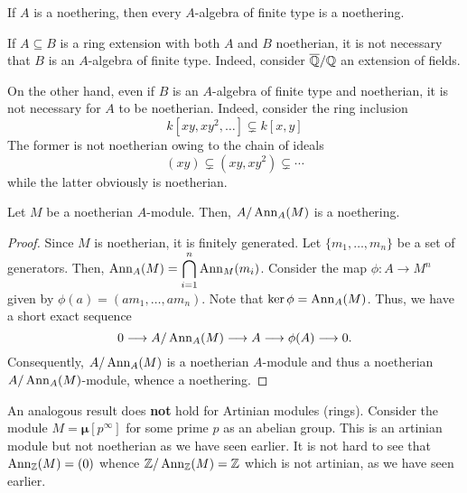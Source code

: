 \begin{corollary}
    If $A$ is a noethering, then every $A$-algebra of finite type is a noethering.
\end{corollary}

If $A\subseteq B$ is a ring extension with both $A$ and $B$ noetherian, it is not necessary that $B$ is an $A$-algebra of finite type. Indeed, consider $\overline{\mathbb{Q}}/\mathbb{Q}$ an extension of fields.

On the other hand, even if $B$ is an $A$-algebra of finite type and noetherian, it is not necessary for $A$ to be noetherian. Indeed, consider the ring inclusion 
\begin{equation*}
    k[xy,xy^2,\ldots]\subsetneq k[x,y]
\end{equation*}
The former is not noetherian owing to the chain of ideals 
\begin{equation*}
    (xy)\subsetneq(xy,xy^2)\subsetneq\cdots
\end{equation*}
while the latter obviously is noetherian.

\begin{proposition}
    Let $M$ be a noetherian $A$-module. Then, $A/\operatorname{Ann}_A(M)$ is a noethering.
\end{proposition}
\begin{proof}
    Since $M$ is noetherian, it is finitely generated. Let $\{m_1,\ldots,m_n\}$ be a set of generators. Then, $\displaystyle\operatorname{Ann}_A(M) = \bigcap_{i = 1}^n\operatorname{Ann}_M(m_i)$. Consider the map $\phi: A\to M^n$ given by $\phi(a) = (am_1,\ldots,am_n)$. Note that $\ker\phi = \operatorname{Ann}_A(M)$. Thus, we have a short exact sequence 
    \begin{equation*}
        0\longrightarrow A/\operatorname{Ann}_A(M)\longrightarrow A\longrightarrow\phi(A)\longrightarrow 0.
    \end{equation*}
    Consequently, $A/\operatorname{Ann}_A(M)$ is a noetherian $A$-module and thus a noetherian $A/\operatorname{Ann}_A(M)$-module, whence a noethering.
\end{proof}

An analogous result does \textbf{not} hold for Artinian modules (rings). Consider the module $M = \bm{\mu}[p^\infty]$ for some prime $p$ as an abelian group. This is an artinian module but not noetherian as we have seen earlier. It is not hard to see that $\operatorname{Ann}_{\mathbb{Z}}(M) = (0)$ whence $\mathbb{Z}/\operatorname{Ann}_{\mathbb{Z}}(M) = \mathbb{Z}$ which is not artinian, as we have seen earlier.

